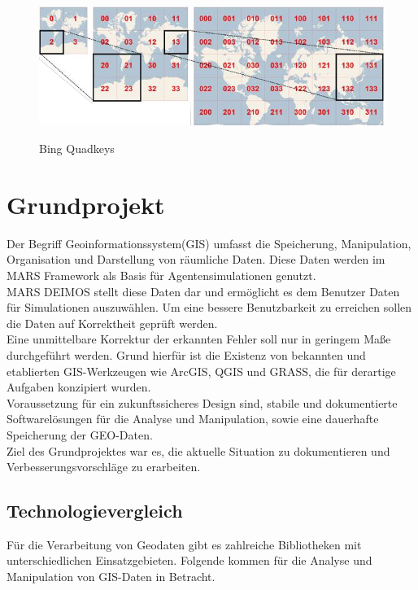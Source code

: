 \documentclass[10pt,conference,compsocconf]{IEEEtran}
\begin{document}
\begin{figure}[H]
	\centering
	\includegraphics[width=1\columnwidth]{img/bing_quads.png}\\
	\caption[]{Bing Quadkeys\footnotemark}
	\label{img:bing_quads}
\end{figure}



\section{Grundprojekt}
Der Begriff Geoinformationssystem(GIS) umfasst die Speicherung, Manipulation, Organisation und Darstellung von räumliche Daten. Diese Daten werden im MARS Framework als Basis für Agentensimulationen genutzt.\\
MARS DEIMOS stellt diese Daten dar und ermöglicht es dem Benutzer Daten für Simulationen auszuwählen. Um eine bessere Benutzbarkeit zu erreichen sollen die Daten auf Korrektheit geprüft werden.\\
Eine unmittelbare Korrektur der erkannten Fehler soll nur in geringem Maße durchgeführt werden. Grund hierfür ist die Existenz von bekannten und etablierten GIS-Werkzeugen wie ArcGIS, QGIS und GRASS, die für derartige Aufgaben konzipiert wurden.\\
Voraussetzung für ein zukunftssicheres Design sind, stabile und dokumentierte Softwarelösungen für die Analyse und Manipulation, sowie eine dauerhafte Speicherung der GEO-Daten.\\
Ziel des Grundprojektes war es, die aktuelle Situation zu dokumentieren und Verbesserungsvorschläge zu erarbeiten.\\


\subsection{Technologievergleich}
Für die Verarbeitung von Geodaten gibt es zahlreiche Bibliotheken mit unterschiedlichen Einsatzgebieten. Folgende kommen für die Analyse und Manipulation von GIS-Daten in Betracht.\\
\end{document}
